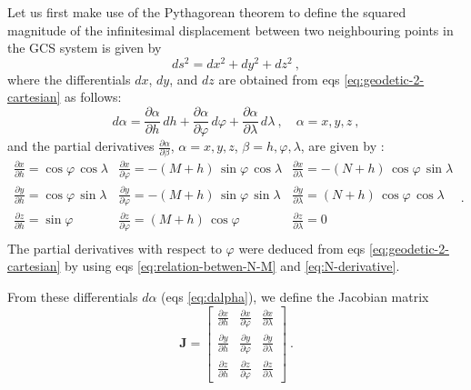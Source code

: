 \documentclass[mreferee]{gji}
\begin{document}
Let us first make use of the Pythagorean theorem to define the
squared magnitude of the infinitesimal displacement between two
neighbouring points in the GCS system is given by
\begin{equation} \label{eq:ds2-cartesian}
ds^{2} = dx^{2} + dy^{2} + dz^{2} \: ,
\end{equation}
where the differentials $dx$, $dy$, and $dz$ are obtained from
eqs \ref{eq:geodetic-2-cartesian} as follows:
\begin{equation} \label{eq:dalpha}
d\alpha = \frac{\partial \alpha}{\partial h} \, dh +
\frac{\partial \alpha}{\partial \varphi} \, d\varphi +
\frac{\partial \alpha}{\partial \lambda} \, d\lambda
\: , \quad \alpha = x, y, z \: ,
\end{equation}
and the partial derivatives $\frac{\partial \alpha}{\partial \beta}$,
$\alpha = x, y, z$, $\beta = h, \varphi, \lambda$, are given by \citep{soler1976}:
\begin{equation} \label{eq:dalpha-dbeta}
\begin{array}{ccc}
\frac{\partial x}{\partial h} = \cos\varphi \, \cos\lambda &
\frac{\partial x}{\partial \varphi} = -\left( M + h \right) \, \sin\varphi \, \cos\lambda &
\frac{\partial x}{\partial \lambda} = -\left( N + h \right) \, \cos\varphi \, \sin\lambda \\
\frac{\partial y}{\partial h} = \cos\varphi \, \sin\lambda &
\frac{\partial y}{\partial \varphi} = -\left( M + h \right) \, \sin\varphi \, \sin\lambda &
\frac{\partial y}{\partial \lambda} = \left( N + h \right) \, \cos\varphi \, \cos\lambda \\
\frac{\partial z}{\partial h} = \sin\varphi &
\frac{\partial z}{\partial \varphi} = \left( M + h \right) \, \cos\varphi &
\frac{\partial z}{\partial \lambda} = 0 \\
\end{array} \: .
\end{equation}
The partial derivatives with respect to $\varphi$ were deduced from
eqs \ref{eq:geodetic-2-cartesian} by using
eqs \ref{eq:relation-betwen-N-M} and \ref{eq:N-derivative}.

From these differentials $d\alpha$ (eqs \ref{eq:dalpha}), we define the
Jacobian matrix
\begin{equation} \label{eq:Jacobian-matrix}
\mathbf{J} = \begin{bmatrix}
\frac{\partial x}{\partial h} & \frac{\partial x}{\partial \varphi} & \frac{\partial x}{\partial \lambda} \\
\frac{\partial y}{\partial h} & \frac{\partial y}{\partial \varphi} & \frac{\partial y}{\partial \lambda} \\
\frac{\partial z}{\partial h} & \frac{\partial z}{\partial \varphi} & \frac{\partial z}{\partial \lambda}
\end{bmatrix} \: .
\end{equation}
\end{document}
